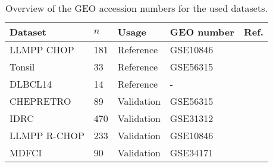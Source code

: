 \begin{table}%
\small
\caption{Overview of the GEO accession numbers for the used datasets.}
\label{table:01}%
\begin{center}
\begin{tabular}{lllll}
\hline\hline
Dataset & $n$ & Usage & GEO number & Ref.
\\
\hline
LLMPP CHOP & 181 & Reference & GSE10846 & \citep{Lenz2008a}
\\
Tonsil & 33 & Reference & GSE56315 & \citep{Dybkaer2013}
\\
DLBCL14 & 14 & Reference & - & \citep{Falgreen2013c}
\\
CHEPRETRO & 89 & Validation & GSE56315 & \citep{Dybkaer2013}
\\
IDRC & 470 & Validation & GSE31312 & \citep{Visco2012}
\\
LLMPP R-CHOP & 233 & Validation & GSE10846 & \citep{Lenz2008a}
\\
MDFCI & 90 & Validation & GSE34171 & \citep{Monti2012a}\\
\hline
\end{tabular}
\end{center}
\end{table}
